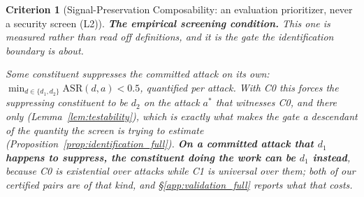 \documentclass{article}
\newtheorem{criterion}[theorem]{Criterion}
\begin{document}
\begin{criterion}[Signal-Preservation Composability: an evaluation prioritizer, never a security screen (L2)]
\smallskip
\noindent\textbf{The empirical screening condition.} This one is measured rather than read off definitions, and it is the gate the identification boundary is about.
\begin{description}[noitemsep,topsep=2pt]
\item[(C1) Standalone suppression.] Some constituent suppresses the committed attack on its own: $\min_{d\in\{d_1,d_2\}}\mathrm{ASR}(d,a) < 0.5$, quantified \emph{per attack}. With C0 this forces the suppressing constituent to be $d_2$ \emph{on the attack $a^*$ that witnesses C0}, and there only (Lemma~\ref{lem:testability}), which is exactly what makes the gate a descendant of the quantity the screen is trying to estimate (Proposition~\ref{prop:identification_full}). \textbf{On a committed attack that $d_1$ happens to suppress, the constituent doing the work can be $d_1$ instead}, because C0 is existential over attacks while C1 is universal over them; both of our certified pairs are of that kind, and §\ref{app:validation_full} reports what that costs.
\end{description}


\end{criterion}
\end{document}
